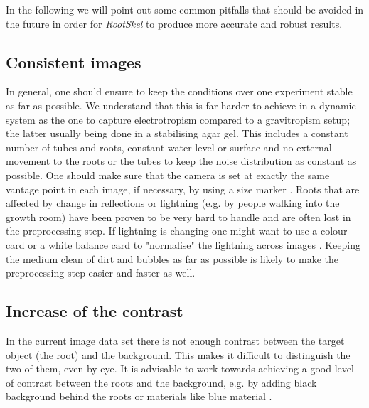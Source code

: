 In the following we will point out some common pitfalls that should be avoided in the future in order for \textit{RootSkel} to produce more accurate and robust results.


\subsection{Consistent images}

In general, one should ensure to keep the conditions over one experiment stable as far as possible. We understand that this is far harder to achieve in a dynamic system as the one to capture electrotropism compared to a gravitropism setup; the latter usually being done in a stabilising agar gel. 
This includes a constant number of tubes and roots, constant water level or surface and no external movement to the roots or the tubes to keep the noise distribution as constant as possible. One should make sure that the camera is set at exactly the same vantage point in each image, if necessary, by using a size marker \cite{plantCV}. 
Roots that are affected by change in reflections or lightning (e.g. by people walking into the growth room) have been proven to be very hard to handle and are often lost in the preprocessing step. If lightning is changing one might want to use a colour card or a white balance card to "normalise" the lightning across images \cite{plantCV}. 
Keeping the medium clean of dirt and bubbles as far as possible is likely to make the preprocessing step easier and faster as well.


\subsection{Increase of the contrast}

In the current image data set there is not enough contrast between the target object (the root) and the background. This makes it difficult to distinguish the two of them, even by eye. It is advisable to work towards achieving a good level of contrast between the roots and the background, e.g. by adding black background behind the roots or materials like blue material \cite{plantCV}. 


